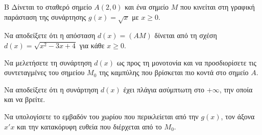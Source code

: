 \begin{thema}{Β}
Δίνεται το σταθερό σημείο $A(2, 0)$ και ένα σημείο $M$ που κινείται στη γραφική παράσταση της συνάρτησης $g(x) = \sqrt{x}$ με $x \ge 0$.
\begin{erwthma}
  \item Να αποδείξετε ότι η απόσταση $d(x) = (AM)$ δίνεται από τη σχέση $d(x) = \sqrt{x^2 - 3x + 4}$ για κάθε $x \ge 0$.
  \item Να μελετήσετε τη συνάρτηση $d(x)$ ως προς τη μονοτονία και να προσδιορίσετε τις συντεταγμένες του σημείου $M_{0}$ της καμπύλης που βρίσκεται πιο κοντά στο σημείο $A$.
  \item Να αποδείξετε ότι η συνάρτηση $d(x)$ έχει πλάγια ασύμπτωτη στο $+\infty$, την οποία και να βρείτε.
  \item Να υπολογίσετε το εμβαδόν του χωρίου που περικλείεται από την $g(x)$, τον άξονα $x'x$ και την κατακόρυφη ευθεία που διέρχεται από το $M_0$.
\end{erwthma}
\end{thema}
